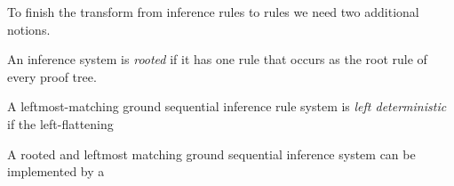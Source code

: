 \documentclass[letterpaper,11pt]{article}
\begin{document}
To finish the transform from inference rules to \HAX rules we need two additional notions.

\begin{definition}
  An inference system is \emph{rooted} if it has one rule that occurs as the root rule of every
  proof tree.
\end{definition}

\begin{definition}
  A leftmost-matching ground sequential inference rule system is \emph{left deterministic} if the
  left-flattening 
\end{definition}

\begin{theorem}
  A rooted and leftmost matching ground sequential inference system can be implemented by a 
\end{theorem}
\end{document}
